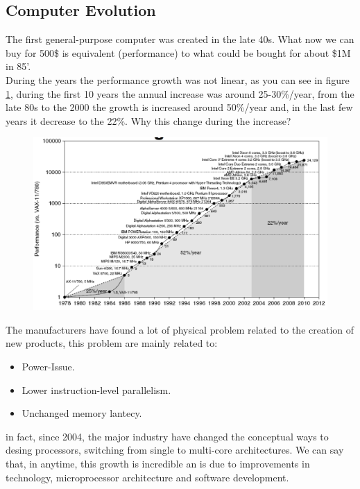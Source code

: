 \documentclass[12pt]{article}
\begin{document}
\subsection{Computer Evolution}
The first general-purpose computer was created in the late 40s. What now we can buy for 500\$ is equivalent (performance) to what could be bought for about \$1M in 85'.\\
During the years the performance growth was not linear, as you can see in figure \ref{fig:cpugrowth}, during the first 10 years the annual increase was around 25-30\%/year, from the late 80s to the 2000 the growth is increased around 50\%/year and, in the last few years it decrease to the 22\%. Why this change during the increase?\\
\begin{figure}[h!]
  \centering
  \includegraphics[width=\linewidth]{images/cpugrowth.png}
  \label{fig:cpugrowth}
\end{figure}
The manufacturers have found a lot of physical problem related to the creation of new products, this problem are mainly related to:
\begin{itemize}
  \item Power-Issue.
  \item Lower instruction-level parallelism.
  \item Unchanged memory lantecy.
\end{itemize}
in fact, since 2004, the major industry have changed the conceptual ways to desing processors, switching from single to multi-core architectures. We can say that, in anytime, this growth is incredible an is due to improvements in technology, microprocessor architecture and software development. %




\end{document}
